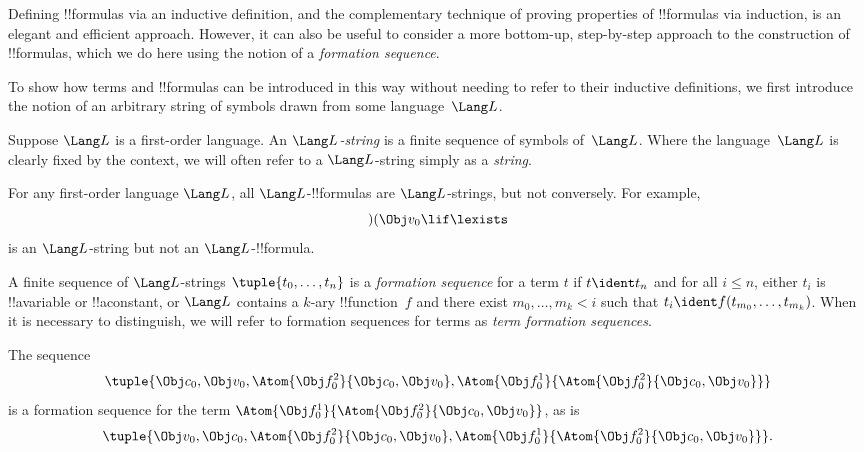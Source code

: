

Defining !!{formula}s via an inductive definition, and the
complementary technique of proving properties of !!{formula}s via
induction, is an elegant and efficient approach. However, it can
also be useful to consider a more bottom-up, step-by-step approach
to the construction of !!{formula}s, which we do here using the
notion of a \emph{formation sequence}.

To show how terms and !!{formula}s can be introduced in this way
without needing to refer to their inductive definitions, we first
introduce the notion of an arbitrary string of symbols drawn from
some language~$\Lang L$.

\begin{defn}[Strings]
Suppose $\Lang L$ is a first-order language. An \emph{$\Lang
L$-string} is a finite sequence of symbols of~$\Lang L$. Where the
language~$\Lang L$ is clearly fixed by the context, we will often
refer to a $\Lang L$-string simply as a \emph{string}.
\end{defn}

\begin{ex}
For any first-order language $\Lang L$, all
$\Lang L$-!!{formula}s are $\Lang L$-strings, but not
conversely. For example, \[)(\Obj v_0\lif\lexists\] is an
$\Lang L$-string but not an $\Lang L$-!!{formula}.
\end{ex}

\begin{defn}
A finite sequence of $\Lang L$-strings $\tuple{t_0,\dotsc,t_n}$ is a
\emph{formation sequence} for a term $t$ if $t \ident t_n$ and for all
$i \leq n$, either $t_i$ is !!a{variable} or !!a{constant}, or $\Lang
L$ contains a $k$-ary !!{function}~$f$ and there exist
$m_0,\dotsc,m_k < i$ such that $t_i \ident f(t_{m_0},\dotsc,t_{m_k})$.
When it is necessary to distinguish, we will refer to formation
sequences for terms as \emph{term formation sequences}.
\end{defn}

\begin{ex}
The sequence
\[
    \tuple{\Obj c_0, \Obj v_0, \Atom{\Obj f^2_0}{\Obj c_0, \Obj v_0}, \Atom{\Obj f^1_0}{\Atom{\Obj f^2_0}{\Obj c_0, \Obj v_0}}}
\]
is a formation sequence for the term $\Atom{\Obj f^1_0}{\Atom{\Obj
f^2_0}{\Obj c_0, \Obj v_0}}$, as is
\[
    \tuple{\Obj v_0, \Obj c_0, \Atom{\Obj f^2_0}{\Obj c_0, \Obj v_0}, \Atom{\Obj f^1_0}{\Atom{\Obj f^2_0}{\Obj c_0, \Obj v_0}}}.
\]
\end{ex}

